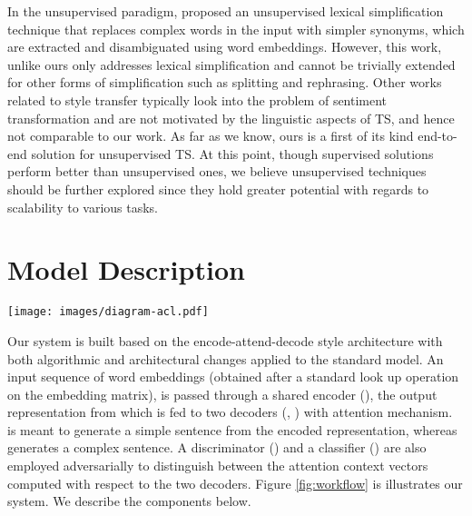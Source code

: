 \documentclass[11pt,a4paper]{article}
\begin{document}
In the unsupervised paradigm,  proposed an unsupervised lexical simplification technique that replaces complex words in the input with simpler synonyms, which are extracted and disambiguated using word embeddings. However, this work, unlike ours only addresses lexical simplification and cannot be trivially extended for other forms of simplification such as splitting and rephrasing. Other works related to style transfer \cite{zhang2018style,shen2017style,xu2018unpaired} typically look into the problem of sentiment transformation and are not motivated by the linguistic aspects of TS, and hence not comparable to our work. As far as we know, ours is a first of its kind end-to-end solution for unsupervised TS. At this point, though supervised solutions perform better than unsupervised ones, we believe unsupervised techniques should be further explored since they hold greater potential with regards to scalability to various tasks.


%
 \section{Model Description}
\label{sec:system}
\begin{figure*}[t]
\centering 
\texttt{[image: images/diagram-acl.pdf]}
\caption{System Architecture. Input sentences of any domain is encoded by , and decoded by , . Discriminator  and classifier  tune the attention vectors for simplification.  represents loss functions. The figure only reveals one layer in ,  and  for simplicity. However, the model uses two layers of GRUs (Section \ref{sec:system}).}
\label{fig:workflow}
\end{figure*}
Our system is built based on the encode-attend-decode style architecture \cite{bahdanau2014neural} with both algorithmic and architectural changes applied to the standard model. An input sequence of word embeddings  (obtained after a standard look up operation on the embedding matrix), is passed through a shared encoder (), the output representation from which is fed to two decoders (, ) with attention mechanism.  is meant to generate a simple sentence from the encoded representation, whereas  generates a complex sentence. A discriminator () and a classifier () are also employed adversarially to distinguish between the attention context vectors computed with respect to the two decoders. Figure \ref{fig:workflow} is illustrates our system. We describe the components below. 
\end{document}
